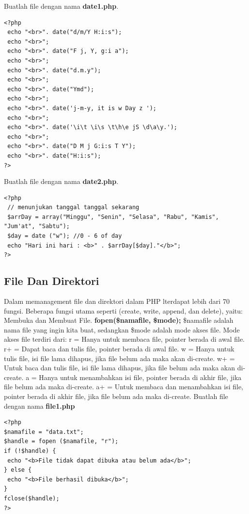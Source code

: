  Buatlah file dengan nama \textbf{date1.php}.
\begin{lstlisting}
<?php
 echo "<br>". date("d/m/Y H:i:s");
 echo "<br>";
 echo "<br>". date("F j, Y, g:i a"); 
 echo "<br>";
 echo "<br>". date("d.m.y"); 
 echo "<br>";
 echo "<br>". date("Ymd"); 
 echo "<br>";
 echo "<br>". date('j-m-y, it is w Day z '); 
 echo "<br>";
 echo "<br>". date('\i\t \i\s \t\h\e jS \d\a\y.'); 
 echo "<br>";
 echo "<br>". date("D M j G:i:s T Y");
 echo "<br>". date("H:i:s"); 
?>
\end{lstlisting}

 Buatlah file dengan nama \textbf{date2.php}.
\begin{lstlisting}
<?php
 // menunjukan tanggal tanggal sekarang
 $arrDay = array("Minggu", "Senin", "Selasa", "Rabu", "Kamis", "Jum'at", "Sabtu");
 $day = date ("w"); //0 - 6 of day
 echo "Hari ini hari : <b>" . $arrDay[$day]."</b>";
?>
\end{lstlisting}

\subsection{File Dan Direktori}
Dalam memanagement file dan direktori dalam PHP lterdapat lebih dari 70 fungsi. Beberapa fungsi utama seperti (create, write, append, dan delete), yaitu: Membuka dan Membuat File.
\newline
\textbf{fopen(\$namafile, \$mode);}
\newline
\$namafile adalah nama file yang ingin kita buat, sedangkan \$mode adalah mode akses file. Mode akses file terdiri dari: 
\newline
r = Hanya untuk membaca file, pointer berada di awal file.
\newline
r+ = Dapat baca dan tulis file, pointer berada di awal file.
\newline
w = Hanya untuk tulis file, isi file lama dihapus, jika file belum ada maka akan di-create.
\newline
w+ = Untuk baca dan tulis file, isi file lama dihapus, jika file belum ada maka akan di-create.
\newline
a = Hanya untuk menambahkan isi file, pointer berada di akhir file, jika file belum ada maka di-create.
\newline
a+ = Untuk membaca dan menambahkan isi file, pointer berada di akhir file, jika file belum ada maka di-create.
\newline
 Buatlah file dengan nama \textbf{file1.php}
\begin{lstlisting}
<?php
$namafile = "data.txt";
$handle = fopen ($namafile, "r");
if (!$handle) {
 echo "<b>File tidak dapat dibuka atau belum ada</b>";
} else {
 echo "<b>File berhasil dibuka</b>";
}
fclose($handle);
?> 
\end{lstlisting}

